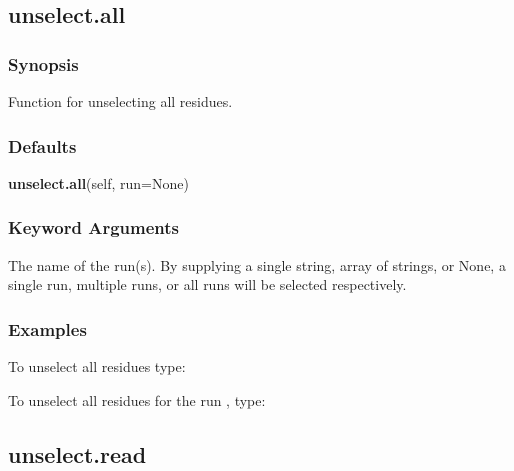 




\newpage

\subsection{unselect.all}


\subsubsection{Synopsis}

Function for unselecting all residues.

\subsubsection{Defaults}

\textsf{\textbf{unselect.all}(self, run=None)}


\subsubsection{Keyword Arguments}


  The name of the run(s).  By supplying a single string, array of strings, or None, a single run, multiple runs, or all runs will be selected respectively.

\subsubsection{Examples}

To unselect all residues type:




To unselect all residues for the run 
, type:





\newpage

\subsection{unselect.read}


